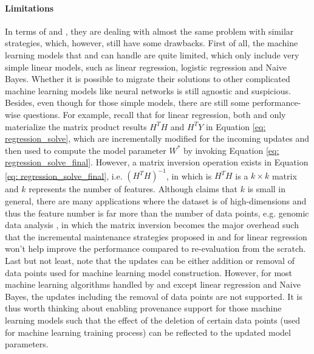 \paragraph{Limitations} In terms of \cite{deshpande2006mauvedb} and \cite{gupta2015processing}, they are dealing with almost the same problem with similar strategies, which, however, still have some drawbacks. First of all, the machine learning models that \cite{deshpande2006mauvedb} and \cite{gupta2015processing} can handle are quite limited, which only include very simple linear models, such as linear regression, logistic regression and Naive Bayes. Whether it is possible to migrate their solutions to other complicated machine learning models like neural networks is still agnostic and suspicious. Besides, even though for those simple models, there are still some performance-wise questions. For example, recall that for linear regression, both \cite{deshpande2006mauvedb} and \cite{gupta2015processing} only materialize the matrix product results $H^TH$ and $H^TY$ in Equation \ref{eq: regression_solve}, which are incrementally modified for the incoming updates and then used to compute the model parameter $W^*$ by invoking Equation \ref{eq: regression_solve_final}. However, a matrix inversion operation exists in Equation \ref{eq: regression_solve_final}, i.e. $(H^TH)^{-1}$, in which is $H^TH$ is a $k\times k$ matrix and $k$ represents the number of features. Although \cite{deshpande2006mauvedb} claims that $k$ is small in general, there are many applications where the dataset is of high-dimensions and thus the feature number is far more than the number of data points, e.g. genomic data analysis \cite{buhlmann2011statistics}, in which the matrix inversion becomes the major overhead such that the incremental maintenance strategies proposed in \cite{deshpande2006mauvedb} and \cite{gupta2015processing} for linear regression won't help improve the performance compared to re-evaluation from the scratch. Last but not least, note that the updates can be either addition or removal of data points used for machine learning model construction. However, for most machine learning algorithms handled by \cite{deshpande2006mauvedb} and \cite{gupta2015processing} except linear regression and Naive Bayes, the updates including the removal of data points are not supported. It is thus worth thinking about enabling provenance support \cite{cheney2009provenance} for those machine learning models such that the effect of the deletion of certain data points (used for machine learning training process) can be reflected to the updated model parameters.

